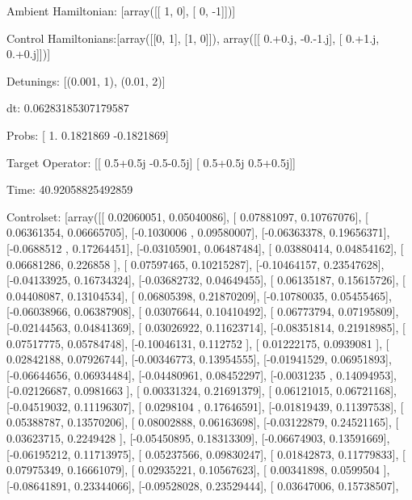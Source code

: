 \documentclass{article}
\begin{document}
    

\newpage

Ambient Hamiltonian: [array([[ 1,  0],
       [ 0, -1]])]

Control Hamiltonians:[array([[0, 1],
       [1, 0]]), array([[ 0.+0.j, -0.-1.j],
       [ 0.+1.j,  0.+0.j]])]

Detunings: [(0.001, 1), (0.01, 2)]

 dt: 0.06283185307179587

Probs: [ 1.         0.1821869 -0.1821869]

Target Operator: [[ 0.5+0.5j -0.5-0.5j]
 [ 0.5+0.5j  0.5+0.5j]]

Time: 40.92058825492859

Controlset: [array([[ 0.02060051,  0.05040086],
       [ 0.07881097,  0.10767076],
       [ 0.06361354,  0.06665705],
       [-0.1030006 ,  0.09580007],
       [-0.06363378,  0.19656371],
       [-0.0688512 ,  0.17264451],
       [-0.03105901,  0.06487484],
       [ 0.03880414,  0.04854162],
       [ 0.06681286,  0.226858  ],
       [ 0.07597465,  0.10215287],
       [-0.10464157,  0.23547628],
       [-0.04133925,  0.16734324],
       [-0.03682732,  0.04649455],
       [ 0.06135187,  0.15615726],
       [ 0.04408087,  0.13104534],
       [ 0.06805398,  0.21870209],
       [-0.10780035,  0.05455465],
       [-0.06038966,  0.06387908],
       [ 0.03076644,  0.10410492],
       [ 0.06773794,  0.07195809],
       [-0.02144563,  0.04841369],
       [ 0.03026922,  0.11623714],
       [-0.08351814,  0.21918985],
       [ 0.07517775,  0.05784748],
       [-0.10046131,  0.112752  ],
       [ 0.01222175,  0.0939081 ],
       [ 0.02842188,  0.07926744],
       [-0.00346773,  0.13954555],
       [-0.01941529,  0.06951893],
       [-0.06644656,  0.06934484],
       [-0.04480961,  0.08452297],
       [-0.0031235 ,  0.14094953],
       [-0.02126687,  0.0981663 ],
       [ 0.00331324,  0.21691379],
       [ 0.06121015,  0.06721168],
       [-0.04519032,  0.11196307],
       [ 0.0298104 ,  0.17646591],
       [-0.01819439,  0.11397538],
       [ 0.05388787,  0.13570206],
       [ 0.08002888,  0.06163698],
       [-0.03122879,  0.24521165],
       [ 0.03623715,  0.2249428 ],
       [-0.05450895,  0.18313309],
       [-0.06674903,  0.13591669],
       [-0.06195212,  0.11713975],
       [ 0.05237566,  0.09830247],
       [ 0.01842873,  0.11779833],
       [ 0.07975349,  0.16661079],
       [ 0.02935221,  0.10567623],
       [ 0.00341898,  0.0599504 ],
       [-0.08641891,  0.23344066],
       [-0.09528028,  0.23529444],
       [ 0.03647006,  0.15738507],
\end{document}
